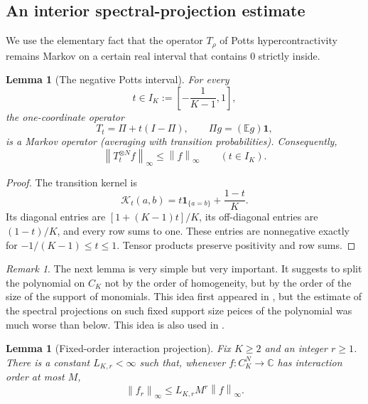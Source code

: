 \documentclass[11pt]{article}
\newtheorem{lemma}[theorem]{Lemma}
\theoremstyle{definition}
\theoremstyle{remark}
\newtheorem{remark}[theorem]{Remark}
\newcommand{\E}{\mathbb{E}}
\newcommand{\C}{\mathbb{C}}
\newcommand{\norm}[1]{\left\lVert #1\right\rVert}
\begin{document}
\subsection{An interior spectral-projection estimate}

We use  the elementary fact that the  operator $T_\rho$ of Potts hypercontractivity remains Markov on a
certain real interval that contains $0$ strictly inside.

\begin{lemma}[The negative Potts interval]
\label{lem:negative-interval}
For every
\begin{equation}
\label{eq:IK}
 t\in I_K:=\left[-\frac1{K-1},1\right],
\end{equation}
the one-coordinate operator
\[
 T_t=\Pi+t(I-\Pi),
 \qquad \Pi g=(\E g)\mathbf 1,
\]
is a Markov operator (averaging with transition probabilities).  Consequently,
\begin{equation}
\label{eq:negative-Linf}
 \norm{T_t^{\otimes N}f}_\infty\le\norm f_\infty
 \qquad(t\in I_K).
\end{equation}
\end{lemma}

\begin{proof}
The transition kernel is
\begin{equation}
\label{eq:negative-kernel}
 \mathcal K_t(a,b)
 =t\mathbf 1_{\{a=b\}}+\frac{1-t}{K}.
\end{equation}
Its diagonal entries are
$[1+(K-1)t]/K$, its off-diagonal entries are $(1-t)/K$, and every row sums
to one.  These entries are nonnegative exactly for
$-1/(K-1)\le t\le1$.  Tensor products preserve positivity and row sums.
\end{proof}

\medskip

\begin{remark}
The next lemma is very simple but very important. It suggests to split the polynomial on $C_K$ not by the order of homogeneity,
but by the order of the size of the support of monomials. This idea first appeared in \cite{SloteVolbergZhang}, 
but the estimate of the spectral projections on such fixed support size peices of the polynomial was much worse than below. 
This idea is also used in \cite{DefantEtAlHamming}.
\end{remark}

\medskip

\begin{lemma}[Fixed-order interaction projection]
\label{lem:projection}
Fix $K\ge2$ and an integer $r\ge1$.  There is a constant
$L_{K,r}<\infty$ such that, whenever $f:C_K^N\to\C$ has interaction order
at most $M$,
\begin{equation}
\label{eq:projection}
 \norm{f_r}_\infty\le L_{K,r}M^r\norm f_\infty.
\end{equation}
\end{lemma}
\end{document}
